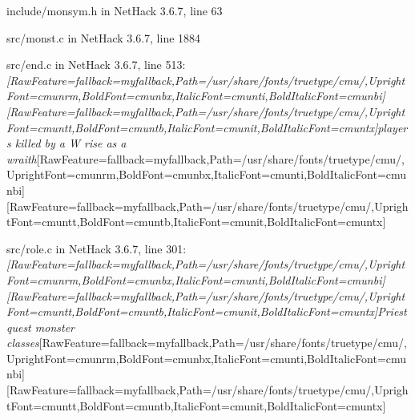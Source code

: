 \documentclass[fontsize=11pt,paper=A4,BCOR=12mm,DIV=13,open=any,listof=totoc,toc=flat]{scrbook}
\begin{document}
\begin{myenumerate}
\item{} include/monsym.h in NetHack 3.6.7, line 63\footnotemark[56]
     

\item{} src/monst.c in NetHack 3.6.7, line 1884\footnotemark[57]
     

\item{} src/end.c in NetHack 3.6.7, line 513\footnotemark[58]: {\itshape \allowbreak{}\setmainfont{cmunti.ttf}[RawFeature={fallback=myfallback},Path=/usr/share/fonts/truetype/cmu/,UprightFont=cmunrm,BoldFont=cmunbx,ItalicFont=cmunti,BoldItalicFont=cmunbi]\setmonofont{cmunti.ttf}[RawFeature={fallback=myfallback},Path=/usr/share/fonts/truetype/cmu/,UprightFont=cmuntt,BoldFont=cmuntb,ItalicFont=cmunit,BoldItalicFont=cmuntx]\itshape players killed by a W rise as a wraith}\allowbreak{}\setmainfont{cmunrm.ttf}[RawFeature={fallback=myfallback},Path=/usr/share/fonts/truetype/cmu/,UprightFont=cmunrm,BoldFont=cmunbx,ItalicFont=cmunti,BoldItalicFont=cmunbi]\setmonofont{cmunrm.ttf}[RawFeature={fallback=myfallback},Path=/usr/share/fonts/truetype/cmu/,UprightFont=cmuntt,BoldFont=cmuntb,ItalicFont=cmunit,BoldItalicFont=cmuntx]
     

\item{} src/role.c in NetHack 3.6.7, line 301\footnotemark[59]: {\itshape \allowbreak{}\setmainfont{cmunti.ttf}[RawFeature={fallback=myfallback},Path=/usr/share/fonts/truetype/cmu/,UprightFont=cmunrm,BoldFont=cmunbx,ItalicFont=cmunti,BoldItalicFont=cmunbi]\setmonofont{cmunti.ttf}[RawFeature={fallback=myfallback},Path=/usr/share/fonts/truetype/cmu/,UprightFont=cmuntt,BoldFont=cmuntb,ItalicFont=cmunit,BoldItalicFont=cmuntx]\itshape Priest quest monster classes}\allowbreak{}\setmainfont{cmunrm.ttf}[RawFeature={fallback=myfallback},Path=/usr/share/fonts/truetype/cmu/,UprightFont=cmunrm,BoldFont=cmunbx,ItalicFont=cmunti,BoldItalicFont=cmunbi]\setmonofont{cmunrm.ttf}[RawFeature={fallback=myfallback},Path=/usr/share/fonts/truetype/cmu/,UprightFont=cmuntt,BoldFont=cmuntb,ItalicFont=cmunit,BoldItalicFont=cmuntx]
     


\end{myenumerate}
\end{document}
